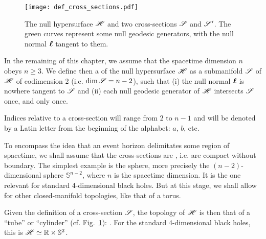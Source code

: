 \begin{figure}
\centerline{\texttt{[image: def\_cross\_sections.pdf]}}
\caption[]{\label{f:def:hor_cylinder} \footnotesize
The null hypersurface $\mathscr{H}$ and two cross-sections $\mathscr{S}$ and $\mathscr{S}'$.
The green curves represent some null geodesic generators, with the null normal
$\bm{\ell}$ tangent to them.}
\end{figure}

In the remaining of this chapter, we assume that the spacetime dimension $n$
obeys $n\geq 3$. We define then a 
of the null hypersurface $\mathscr{H}$
as a submanifold $\mathscr{S}$ of $\mathscr{H}$ of codimension 2 (i.e. $\dim \mathscr{S}=n-2$),
such that (i) the null normal $\bm{\ell}$ is nowhere tangent to $\mathscr{S}$ and (ii)
each null geodesic generator of $\mathscr{H}$ intersects $\mathscr{S}$ once, and only once.

\begin{notation}
Indices relative to a cross-section will range from $2$ to $n-1$ and
will be denoted by a Latin letter from the beginning of the alphabet: $a$, $b$, etc.
\end{notation}

To encompass the idea that an event horizon delimitates some
region of spacetime, we shall assume that the cross-sections
are , i.e.
are compact without boundary. The simplest example is the sphere,
more precisely the $(n-2)$-dimensional sphere $\mathbb{S}^{n-2}$, where $n$
is the spacetime dimension. It is the one relevant for standard 4-dimensional
black holes. But at this stage, we shall allow for other
closed-manifold topologies, like that of a torus.

Given the definition of a cross-section $\mathscr{S}$,
the topology of $\mathscr{H}$ is then that of a ``tube'' or ``cylinder''
(cf. Fig.~\ref{f:def:hor_cylinder}):
\be \label{e:def:H_topology}
    \Hor \simeq \R \times \Sp.
\ee
For the standard 4-dimensional black holes, this is
$\mathscr{H} \simeq \mathbb{R} \times \mathbb{S}^{2}$.

